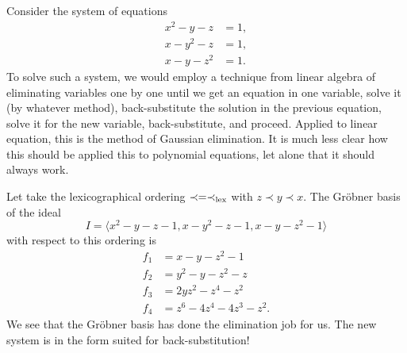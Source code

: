 \documentclass[11pt]{article}
\begin{document}
Consider the system of equations
\begin{align*}
  x^2-y-z &= 1,\\
  x-y^2-z &= 1,\\
  x-y-z^2 &= 1.
\end{align*}
To solve such a system, we would employ a technique from linear algebra of eliminating variables one by one until we get an equation in one variable, solve it (by whatever method), back-substitute the solution in the previous equation, solve it for the new variable, back-substitute, and proceed.
Applied to linear equation, this is the method of Gaussian elimination.
It is much less clear how this should be applied this to polynomial equations, let alone that it should always work.

Let take the lexicographical ordering $\prec = \prec_{\rm lex}$ with $z \prec y \prec x$.
The Gr\"obner basis of the ideal
\[ I= \langle  x^2-y-z-1, x-y^2-z-1, x-y-z^2 - 1 \rangle\]
with respect to this ordering is
\begin{align*}
  f_1 &= x-y-z^2 - 1\\
  f_2 &= y^2-y-z^2-z \\
  f_3 &= 2yz^2-z^4-z^2\\
  f_4 &= z^6-4z^4-4z^3-z^2.
\end{align*}
We see that the Gr\"obner basis has done the elimination job for us.
The new system is in the form suited for back-substitution!
\end{document}
